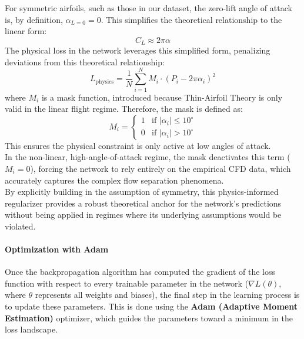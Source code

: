 For symmetric airfoils, such as those in our dataset, the zero-lift angle of attack is, by definition, $\alpha_{L=0}=0$. This simplifies the theoretical relationship to the linear form:
\begin{equation}
    C_L\approx 2\pi \alpha
\end{equation}
The physical loss in the network leverages this simplified form, penalizing deviations from this theoretical relationship:
\begin{equation}
    L_{\text{physics}}=\frac 1N\sum_{i=1}^NM_i\cdot (P_i-2\pi\alpha_i)^2
\end{equation}
where $M_i$ is a mask function, introduced because Thin-Airfoil Theory is only valid in the linear flight regime. Therefore, the mask is defined as:
\begin{equation}
    M_i=\begin{cases}
        1&\text{if }|\alpha_i|\le10^\circ\\
        0&\text{if }|\alpha_i|>10^\circ
    \end{cases}
    \label{eq:03_mask}
\end{equation}
This ensures the physical constraint is only active at low angles of attack.\\
In the non-linear, high-angle-of-attack regime, the mask deactivates this term ($M_i=0$), forcing the network to rely entirely on the empirical CFD data, which accurately captures the complex flow separation phenomena.\\

By explicitly building in the assumption of symmetry, this physics-informed regularizer provides a robust theoretical anchor for the network's predictions without being applied in regimes where its underlying assumptions would be violated.

\paragraph{Optimization with Adam}
\label{sec:03_adam}

Once the backpropagation algorithm has computed the gradient of the loss function with respect to every trainable parameter in the network ($\nabla L(\theta)$, where $\theta$ represents all weights and biases), the final step in the learning process is to update these parameters. This is done using the \textbf{Adam (Adaptive Moment Estimation)} optimizer, which guides the parameters toward a minimum in the loss landscape.\\

